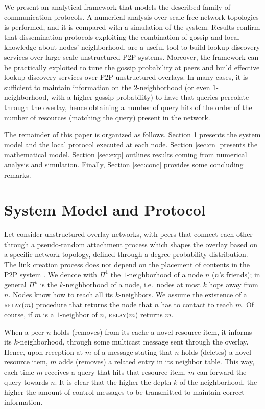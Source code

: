\documentclass{sig-alternate}
\begin{document}
We present an analytical framework that models the described family of communication protocols. A numerical analysis over scale-free network topologies is performed, and it is compared with a simulation of the system. 
Results confirm that dissemination protocols exploiting the combination of gossip and local knowledge about nodes' neighborhood, are a useful tool to build lookup discovery services over large-scale unstructured P2P systems. 
Moreover, the framework can be practically exploited to tune the gossip probability at peers and build effective lookup discovery services over P2P unstructured overlays.
In many cases, it is sufficient to maintain information on the $2$-neighborhood (or even $1$-neighborhood, with a higher gossip probability) to have that queries percolate through the overlay, hence obtaining a number of query hits of the order of the number of resources (matching the query) present in the network.



The remainder of this paper is organized as follows. Section \ref{sec:model} presents the system model and the local protocol executed at each node. Section \ref{sec:cn} presents the mathematical model. Section \ref{sec:exp} outlines results coming from numerical analysis and simulation. Finally, Section \ref{sec:conc} provides some concluding remarks.


\section{System Model and Protocol}\label{sec:model}

Let consider unstructured overlay networks, with peers that connect each other through a pseudo-random attachment process which shapes the overlay based on a specific network topology, defined through a degree probability distribution. The link creation process does not depend on the placement of contents in the P2P system \cite{ferretti_trans.cs.2012.10-12.e2}.
We denote with $\Pi^1$ the $1$-neighbor\-hood of a node $n$ ($n$'s friends); in general $\Pi^k$ is the $k$-neighborhood of a node, i.e.~nodes at most $k$ hops away from $n$. 
Nodes know how to reach all its $k$-neighbors. We assume the existence of a \textsc{relay}($m$) procedure that returns the node that $n$ has to contact to reach $m$. Of course, if $m$ is a $1$-neighbor of $n$, \textsc{relay}($m$) returns $m$.

When a peer $n$ holds (removes) from its cache a novel resource item, it informs its $k$-neighborhood, through some multicast message sent through the overlay.
Hence, upon reception at $m$ of a message stating that $n$ holds (deletes) a novel resource item, $m$ adds (removes) a related entry in its neighbor table. 
This way, each time $m$ receives a query that hits that resource item, $m$ can forward the query towards $n$.
It is clear that the higher the depth $k$ of the neighborhood, the higher the amount of control messages to be transmitted to maintain correct information.
\end{document}
